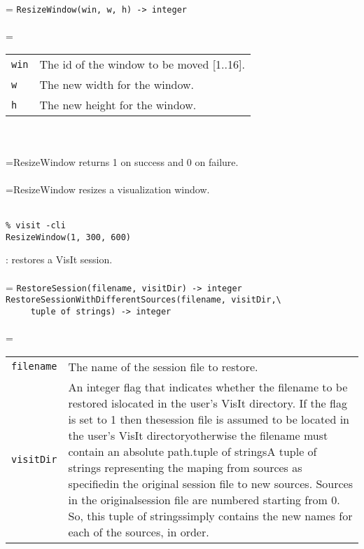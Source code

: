\documentclass[10pt,a4paper]{report}
\begin{document}
 \\ 
\hangindent=\parindent 
\verb!ResizeWindow(win, w, h) -> integer!\\ [-3mm]

 \\ 
\hangindent=\parindent 
\begin{tabular}{lp{9cm}}
\verb!win! & The id of the window to be moved [1..16]. \\
\verb!w! & The new width for the window. \\
\verb!h! & The new height for the window. \\
\end{tabular} \\[-2mm]


 \\ 
\hangindent=\parindent ResizeWindow returns 1 on success and 0 on failure. \\[-3mm] 

 \\ 
\hangindent=\parindent ResizeWindow resizes a visualization window. \\[-3mm] 

\\[-6mm]
\begin{verbatim}% visit -cli
ResizeWindow(1, 300, 600)
\end{verbatim}
\newpage


{}
: restores a VisIt session.\\[-3mm]

 \\ 
\hangindent=\parindent 
\verb!RestoreSession(filename, visitDir) -> integer!\\
\verb!RestoreSessionWithDifferentSources(filename, visitDir,\ ! \\ 
\verb!     tuple of strings) -> integer!\\ [-3mm]

 \\ 
\hangindent=\parindent 
\begin{tabular}{lp{9cm}}
\verb!filename! & The name of the session file to restore. \\
\verb!visitDir! & An integer flag that indicates whether the filename to be restored islocated in the user's VisIt directory. If the flag is set to 1 then thesession file is assumed to be located in the user's VisIt directoryotherwise the filename must contain an absolute path.tuple of stringsA tuple of strings representing the maping from sources as specifiedin the original session file to new sources. Sources in the originalsession file are numbered starting from 0. So, this tuple of stringssimply contains the new names for each of the sources, in order. \\
\end{tabular} \\[-2mm]
\end{document}
